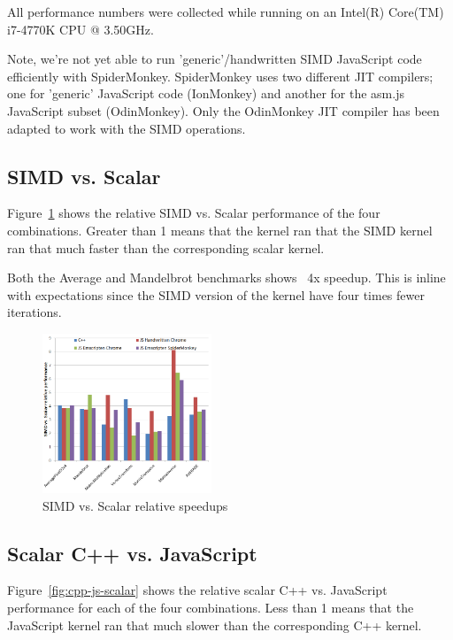 \documentclass[preprint]{sigplanconf}
\begin{document}
All performance numbers were collected while running on an Intel(R) Core(TM) i7-4770K CPU @ 3.50GHz.

Note, we're not yet able to run 'generic'/handwritten SIMD JavaScript code
efficiently with SpiderMonkey.  SpiderMonkey uses two different JIT compilers;
one for 'generic' JavaScript code (IonMonkey) and another for the asm.js
JavaScript subset (OdinMonkey).  Only the OdinMonkey JIT compiler has been
adapted to work with the SIMD operations.

\subsection{SIMD vs. Scalar}

Figure~\ref{fig:simd-scalar-speedup} shows the relative SIMD vs. Scalar performance
of the four combinations.  Greater than 1 means that the kernel ran that the SIMD
kernel ran that much faster than the corresponding scalar kernel.

Both the Average and Mandelbrot benchmarks shows ~4x speedup.  This is inline
with expectations since the SIMD version of the kernel have four times fewer
iterations.

\begin{figure}
\begin{center}
\includegraphics[width=0.45\textwidth]{figures/simd-scalar-speedup.png}
\end{center}
\caption{SIMD vs. Scalar relative speedups}
\label{fig:simd-scalar-speedup}
\end{figure}

\subsection{Scalar C++ vs. JavaScript}

Figure~\ref{fig:cpp-js-scalar} shows the relative scalar C++ vs. JavaScript
performance for each of the four combinations. Less than 1 means that the 
JavaScript kernel ran that much slower than the corresponding C++ kernel.
\end{document}
